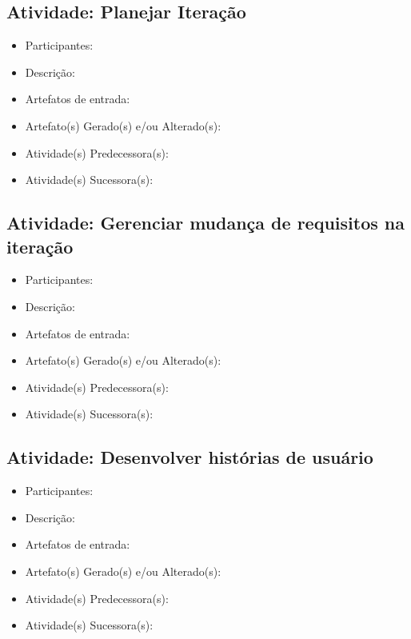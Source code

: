 \subsection{Atividade: Planejar Iteração}
\begin{itemize}
\item Participantes: 

\item Descrição: 

\item Artefatos de entrada: 

\item Artefato(s) Gerado(s) e/ou Alterado(s): 

\item Atividade(s) Predecessora(s): 
  
\item Atividade(s) Sucessora(s): 
\end{itemize}

\subsection{Atividade: Gerenciar mudança de requisitos na iteração}
\begin{itemize}
\item Participantes: 

\item Descrição: 

\item Artefatos de entrada: 

\item Artefato(s) Gerado(s) e/ou Alterado(s): 

\item Atividade(s) Predecessora(s): 
  
\item Atividade(s) Sucessora(s): 
\end{itemize}

\subsection{Atividade: Desenvolver histórias de usuário}
\begin{itemize}
\item Participantes: 

\item Descrição: 

\item Artefatos de entrada: 

\item Artefato(s) Gerado(s) e/ou Alterado(s): 

\item Atividade(s) Predecessora(s): 
  
\item Atividade(s) Sucessora(s): 
\end{itemize}

